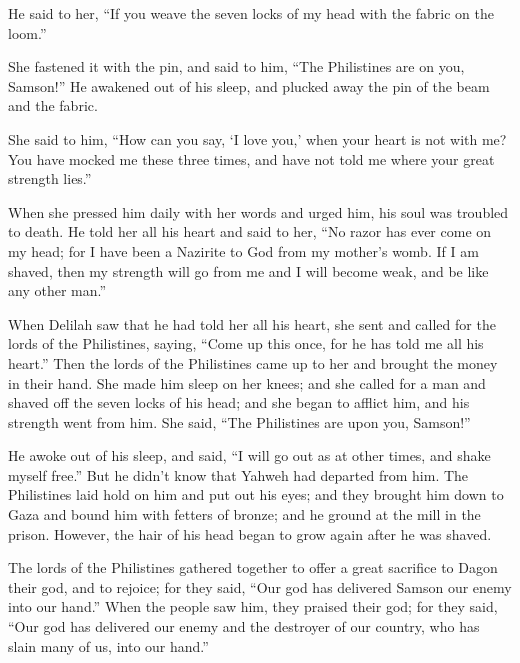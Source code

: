 He said to her, ``If you weave the seven locks of my head with the
fabric on the loom.''

 She fastened it with the pin, and said to him, ``The
Philistines are on you, Samson!'' He awakened out of his sleep, and
plucked away the pin of the beam and the fabric.

 She said to him, ``How can you say, `I love you,' when
your heart is not with me? You have mocked me these three times, and
have not told me where your great strength lies.''

 When she pressed him daily with her words and urged him,
his soul was troubled to death.  He told her all his
heart and said to her, ``No razor has ever come on my head; for I have
been a Nazirite to God from my mother's womb. If I am shaved, then my
strength will go from me and I will become weak, and be like any other
man.''

 When Delilah saw that he had told her all his heart, she
sent and called for the lords of the Philistines, saying, ``Come up this
once, for he has told me all his heart.'' Then the lords of the
Philistines came up to her and brought the money in their hand.
 She made him sleep on her knees; and she called for a
man and shaved off the seven locks of his head; and she began to afflict
him, and his strength went from him.  She said, ``The
Philistines are upon you, Samson!''

He awoke out of his sleep, and said, ``I will go out as at other times,
and shake myself free.'' But he didn't know that Yahweh had departed
from him.  The Philistines laid hold on him and put out
his eyes; and they brought him down to Gaza and bound him with fetters
of bronze; and he ground at the mill in the prison. 
However, the hair of his head began to grow again after he was shaved.

 The lords of the Philistines gathered together to offer
a great sacrifice to Dagon their god, and to rejoice; for they said,
``Our god has delivered Samson our enemy into our hand.''
 When the people saw him, they praised their god; for
they said, ``Our god has delivered our enemy and the destroyer of our
country, who has slain many of us, into our hand.''

